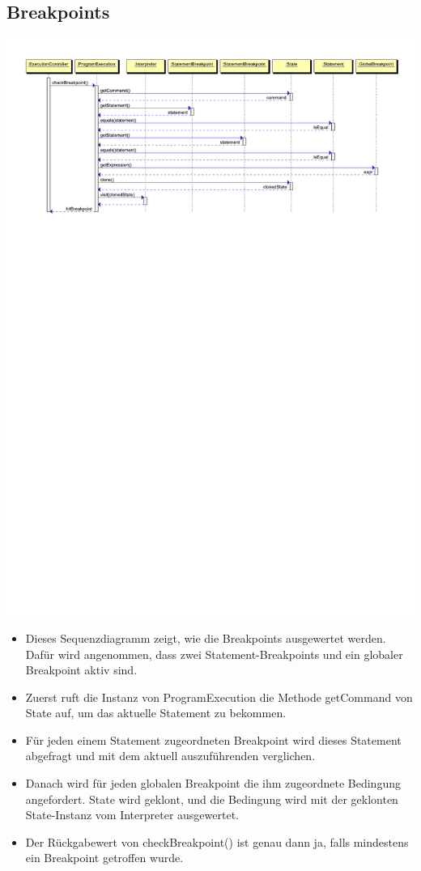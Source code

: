 \documentclass[10pt,a4paper,titlepage]{article}
\begin{document}
\subsection{Breakpoints}
\includegraphics[scale=0.9]{images/Breakpoints.pdf} \newline
\begin{itemize}
\item Dieses Sequenzdiagramm zeigt, wie die Breakpoints ausgewertet werden. Dafür wird angenommen, dass zwei Statement-Breakpoints und ein globaler Breakpoint aktiv sind.
\item Zuerst ruft die Instanz von ProgramExecution die Methode getCommand von State auf, um das aktuelle Statement zu bekommen.
\item Für jeden einem Statement zugeordneten Breakpoint wird dieses Statement abgefragt und mit dem aktuell auszuführenden verglichen.
\item Danach wird für jeden globalen Breakpoint die ihm zugeordnete Bedingung angefordert. State wird geklont, und die Bedingung wird mit der geklonten State-Instanz vom Interpreter ausgewertet.
\item Der Rückgabewert von checkBreakpoint() ist genau dann ja, falls mindestens ein Breakpoint getroffen wurde.
\end{itemize}
\end{document}
